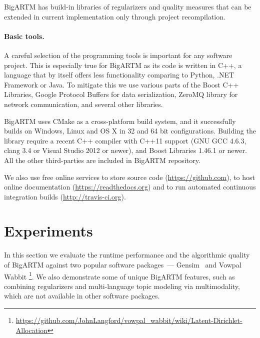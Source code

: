 \documentclass[russian]{llncs}
\begin{document}
BigARTM has build-in libraries of regularizers and quality measures
that can be extended in current implementation only through project recompilation. 

\paragraph{Basic tools.}
A careful selection of the programming tools is important for any software project.
This is especially true for BigARTM as its code is written in C++,
a language that by itself offers less functionality comparing to Python, .NET Framework or Java.
To mitigate this we use
various parts of the Boost C++ Libraries,
Google Protocol Buffers for data serialization,
ZeroMQ library for network communication,
and several other libraries.

BigARTM uses CMake as a cross-platform build system,
and it successfully builds on Windows, Linux and OS X in 32 and 64 bit configurations.
Building the library require a recent C++ compiler with C++11 support (GNU GCC 4.6.3, clang 3.4 or Visual Studio 2012 or newer),
and Boost Libraries 1.46.1 or newer. All the other third-parties are included in BigARTM repository.

We also use free online services
to store source code (\url{https://github.com}),
to host online documentation (\url{https://readthedocs.org}) and
to run automated continuous integration builds (\url{http://travis-ci.org}).

\section{Experiments}
\label{sec:Experiments}

In this section we evaluate the runtime performance and the algorithmic quality of \mbox{BigARTM} 
against two popular software packages~--- 
Gensim~\cite{rehurek_lrec}  
and Vowpal Wabbit%
\footnote{\url{https://github.com/JohnLangford/vowpal_wabbit/wiki/Latent-Dirichlet-Allocation}}.
We also demonstrate some of unique BigARTM features, such as 
combining regularizers and multi-language topic modeling via multimodality,
which are not available in other software packages.
\end{document}
